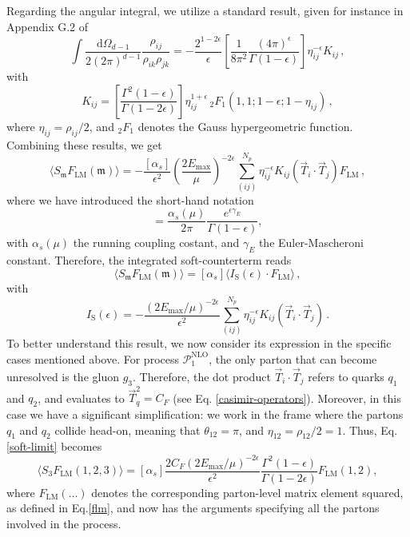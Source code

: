 \documentclass[a4paper, 12pt]{book}
\newcommand{\um}{\mathfrak{m}}
\begin{document}
Regarding the angular integral, we utilize a standard result, given for instance in Appendix G.2 of \cite{Asteriadis:1910}
\begin{equation}
  \int \frac{\mathrm{d}\Omega_{d-1}}{2 (2 \pi)^{d-1}} \frac{\rho_{ij}}{\rho_{ik}\rho_{jk} } = - \frac{2^{1-2\epsilon}}{\epsilon} \left[\frac{1}{8 \pi^2} \frac{(4\pi)^{\epsilon}}{\Gamma(1-\epsilon)}  \right]\eta_{ij}^{-\epsilon} K_{ij} \, ,
\end{equation}
with
\begin{equation}
  K_{ij} = \left[ \frac{\Gamma^2(1-\epsilon)}{\Gamma(1-2\epsilon)}\right] \eta_{ij}^{1+\epsilon} \, {}_2F_1(1,1;1-\epsilon; 1-\eta_{ij}) \, ,
  \label{k-function}
\end{equation}
where $\eta_{ij}=\rho_{ij}/2$, and ${}_2F_1$ denotes the Gauss hypergeometric function. Combining these results, we get 
\begin{equation}
   \langle S_\um F_{\mathrm{LM}} (\um) \rangle = - \frac{[\alpha_s]}{\epsilon^2} \left(\frac{2 E_{\mathrm{max}}}{\mu}\right)^{-2\epsilon} \sum_{(ij)}^{N_p} \eta_{ij}^{-\epsilon}  K_{ij} (\vec{T}_i \cdot \vec{T}_j) F_{\mathrm{LM}} \, ,
   \label{soft-limit}
\end{equation}
where we have introduced the short-hand notation
\begin{equation}
  [\alpha_s]= \frac{\alpha_s(\mu)}{2\pi} \frac{e^{\epsilon \gamma_E}}{\Gamma(1-\epsilon)}, 
\end{equation}
with $\alpha_s(\mu)$ the running coupling costant, and $\gamma_E$ the Euler-Mascheroni constant. Therefore, the integrated soft-counterterm reads
\begin{equation}
  \langle S_\um F_{\mathrm{LM}} (\um) \rangle = [\alpha_s] \langle I_{\mathrm{S}}(\epsilon) \cdot F_{\mathrm{LM}}\rangle \, , 
  \label{soft-regulated}
\end{equation}
with 
\begin{equation}
  I_\mathrm{S}(\epsilon)= - \frac{\left(2E_{\mathrm{max}}/\mu\right)^{-2\epsilon}}{\epsilon^2} \sum_{(ij)}^{N_p} \eta_{ij}^{-\epsilon} K_{ij} (\vec{T}_i \cdot \vec{T}_j) \, .
\end{equation}
To better understand this result, we now consider its expression in the specific cases mentioned above. For process $\mathcal{P}_{1}^{\mathrm{NLO}}$, the only parton that can become unresolved is the gluon $g_3$. Therefore, the dot product $\vec{T}_i \cdot \vec{T}_j$ refers to quarks $q_1$ and $q_2$, and evaluates to $\vec{T}_q^2 = C_F$ (see Eq. \ref{casimir-operators}). Moreover, in this case we have a significant simplification: we work in the frame where the partons $q_1$ and $q_2$ collide head-on, meaning that $\theta_{12}=\pi$, and $\eta_{12}=\rho_{12}/2=1$. Thus, Eq. \ref{soft-limit} becomes
\begin{equation}
  \langle S_3 F_\mathrm{LM}(1,2,3) \rangle = [\alpha_s] \frac{2 C_F (2E_\mathrm{max}/\mu)^{-2\epsilon}}{\epsilon^2}\frac{\Gamma^2(1-\epsilon)}{\Gamma(1-2\epsilon)}  F_\mathrm{LM}(1,2),
\end{equation}
where $F_\mathrm{LM}(\dots)$ denotes the corresponding parton-level matrix element squared, as defined in Eq.\ref{flm}, and now has the arguments specifying all the partons involved in the process. \\
\end{document}
